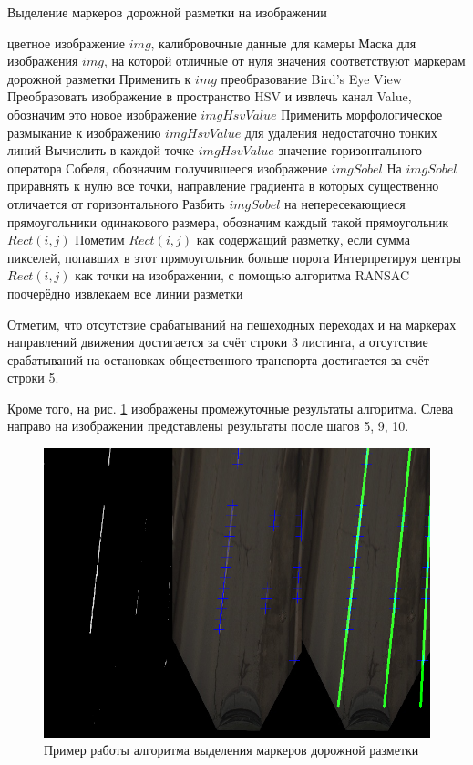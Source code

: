 \documentclass[aps,%
14pt,%
final,%
oneside,
onecolumn,%
musixtex, %
superscriptaddress,%
centertags]{extarticle} %
\begin{document}
\begin{algorithm}
\caption{Выделение маркеров дорожной разметки на изображении}\label{alg:euclid}
\label{alg:markers}
\begin{algorithmic}[1]
\Require цветное изображение $img$, калибровочные данные для камеры
\Ensure Маска для изображения $img$, на которой отличные от нуля значения соответствуют маркерам дорожной разметки
\State Применить к $img$ преобразование Bird's Eye View
\State Преобразовать изображение в пространство HSV и извлечь канал Value, обозначим это новое изображение $imgHsvValue$
\State Применить морфологическое размыкание к изображению $imgHsvValue$ для удаления недостаточно тонких линий
\State Вычислить в каждой точке $imgHsvValue$ значение горизонтального оператора Собеля, обозначим получившееся изображение $imgSobel$
\State На $imgSobel$ приравнять к нулю все точки, направление градиента в которых существенно отличается от горизонтального
\State Разбить $imgSobel$ на непересекающиеся прямоугольники одинакового размера, обозначим каждый такой прямоугольник $Rect(i, j)$
\State Пометим $Rect(i, j)$ как содержащий разметку, если сумма пикселей, попавших в этот прямоугольник больше порога
\EndFor
\State Интерпретируя центры $Rect(i, j)$ как точки на изображении, с помощью алгоритма RANSAC поочерёдно извлекаем все линии разметки
\end{algorithmic}
\end{algorithm}

Отметим, что отсутствие срабатываний на пешеходных переходах и на маркерах направлений движения достигается за счёт строки 3 листинга, а отсутствие срабатываний на остановках общественного транспорта достигается за счёт строки 5.

Кроме того, на рис. \ref{fig:lanes_pipline} изображены промежуточные результаты алгоритма. Слева направо на изображении представлены результаты после шагов 5, 9, 10. 

\begin{figure}[H]
     \includegraphics[width=\textwidth]{lanes_pipeline.png}
     \caption{Пример работы алгоритма выделения маркеров дорожной разметки}
     \label{fig:lanes_pipline}
\end{figure}
\end{document}
